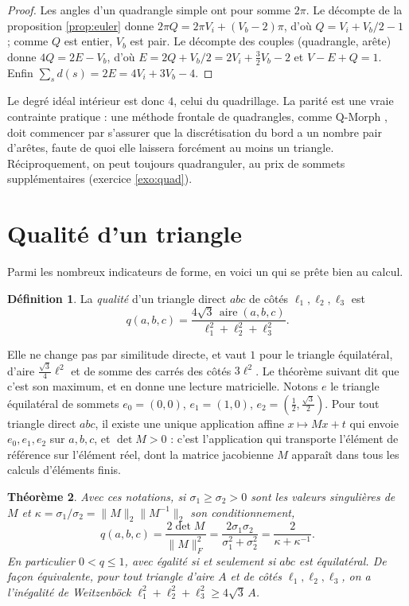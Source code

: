 \documentclass[11pt,a4paper]{article}
\theoremstyle{plain}
\newtheorem{theoreme}{Théorème}[section]
\theoremstyle{definition}
\newtheorem{definition}[theoreme]{Définition}
\theoremstyle{remark}
\DeclareMathOperator{\aire}{aire}
\begin{document}
\begin{proof}
Les angles d'un quadrangle simple ont pour somme $2\pi$. Le décompte de la proposition \ref{prop:euler} donne $2\pi Q=2\pi V_i+(V_b-2)\pi$, d'où $Q=V_i+V_b/2-1$ ; comme $Q$ est entier, $V_b$ est pair. Le décompte des couples (quadrangle, arête) donne $4Q=2E-V_b$, d'où $E=2Q+V_b/2=2V_i+\frac32V_b-2$ et $V-E+Q=1$. Enfin $\sum_sd(s)=2E=4V_i+3V_b-4$.
\end{proof}

Le degré idéal intérieur est donc $4$, celui du quadrillage. La parité est une vraie contrainte pratique : une méthode frontale de quadrangles, comme Q-Morph \cite{qmorph}, doit commencer par s'assurer que la discrétisation du bord a un nombre pair d'arêtes, faute de quoi elle laissera forcément au moins un triangle. Réciproquement, on peut toujours quadranguler, au prix de sommets supplémentaires (exercice \ref{exo:quad}).

\section{Qualité d'un triangle}

Parmi les nombreux indicateurs de forme, en voici un qui se prête bien au calcul.

\begin{definition}\label{def:qualite}
La \emph{qualité} d'un triangle direct $abc$ de côtés $\ell_1,\ell_2,\ell_3$ est
\[
  q(a,b,c)=\frac{4\sqrt3\,\aire(a,b,c)}{\ell_1^2+\ell_2^2+\ell_3^2}.
\]
\end{definition}

Elle ne change pas par similitude directe, et vaut $1$ pour le triangle équilatéral, d'aire $\frac{\sqrt3}4\ell^2$ et de somme des carrés des côtés $3\ell^2$. Le théorème suivant dit que c'est son maximum, et en donne une lecture matricielle. Notons $e$ le triangle équilatéral de sommets $e_0=(0,0)$, $e_1=(1,0)$, $e_2=(\frac12,\frac{\sqrt3}2)$. Pour tout triangle direct $abc$, il existe une unique application affine $x\mapsto Mx+t$ qui envoie $e_0,e_1,e_2$ sur $a,b,c$, et $\det M>0$ : c'est l'application qui transporte l'élément de référence sur l'élément réel, dont la matrice jacobienne $M$ apparaît dans tous les calculs d'éléments finis.

\begin{theoreme}\label{thm:qualite}
Avec ces notations, si $\sigma_1\geq\sigma_2>0$ sont les valeurs singulières de $M$ et $\kappa=\sigma_1/\sigma_2=\|M\|_2\|M^{-1}\|_2$ son conditionnement,
\[
  q(a,b,c)=\frac{2\det M}{\|M\|_F^2}=\frac{2\sigma_1\sigma_2}{\sigma_1^2+\sigma_2^2}=\frac{2}{\kappa+\kappa^{-1}}.
\]
En particulier $0<q\leq1$, avec égalité si et seulement si $abc$ est équilatéral. De façon équivalente, pour tout triangle d'aire $A$ et de côtés $\ell_1,\ell_2,\ell_3$, on a l'inégalité de Weitzenböck $\ell_1^2+\ell_2^2+\ell_3^2\geq4\sqrt3\,A$.
\end{theoreme}
\end{document}
